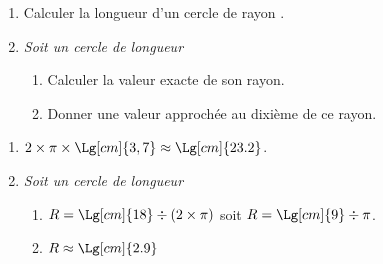 \begin{methode}
    \exercice
        \begin{enumerate}
            \item Calculer la longueur d'un cercle de rayon .
            \item \textit{Soit un cercle de longueur }
            \begin{enumerate}
                \item Calculer la valeur exacte de son rayon.
                \item Donner une valeur approchée au dixième de ce rayon.
            \end{enumerate}
        \end{enumerate}
    \correction
    \begin{enumerate}
        \item $2\times\pi\times \Lg[cm]{3,7}\approx\Lg[cm]{23.2}$.
        \item \textit{Soit un cercle de longueur }
        \begin{enumerate}
            \item $R=\Lg[cm]{18}\div (2\times\pi)$ soit $R=\Lg[cm]{9}\div \pi$.
            \item $R\approx \Lg[cm]{2.9}$
        \end{enumerate}
    \end{enumerate}
\end{methode}    
